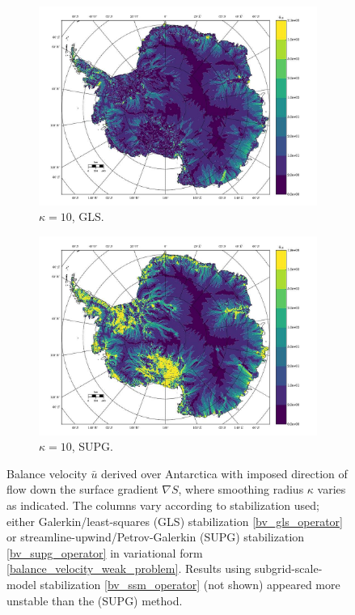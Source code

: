 \begin{figure}
  \begin{subfigure}[b]{0.45\linewidth}
    \includegraphics[width=\linewidth]{images/balance_velocity/antarctica/Ubar_10H_kappa_10_GLS.jpg}
  \caption{$\kappa = 10$, GLS.}
  \label{antarctica_bv_image_kappa_10_GLS}
  \end{subfigure}
  \begin{subfigure}[b]{0.45\linewidth}
    \includegraphics[width=\linewidth]{images/balance_velocity/antarctica/Ubar_10H_kappa_10_SUPG.jpg}
  \caption{$\kappa = 10$, SUPG.}
  \label{antarctica_bv_image_kappa_10_SUPG}
  \end{subfigure}
  
  \caption[Antarctica balance-velocity with $\mathbf{d}^{\text{data}} = -\nabla S$.]{Balance velocity $\bar{u}$ derived over Antarctica with imposed direction of flow down the surface gradient $\nabla S$, where smoothing radius $\kappa$ varies as indicated.  The columns vary according to stabilization used; either Galerkin/least-squares (GLS) stabilization \cref{bv_gls_operator} or streamline-upwind/Petrov-Galerkin (SUPG) stabilization \cref{bv_supg_operator} in variational form \cref{balance_velocity_weak_problem}.  Results using subgrid-scale-model stabilization \cref{bv_ssm_operator} (not shown) appeared more unstable than the (SUPG) method. \newline \newline}


\end{figure}
